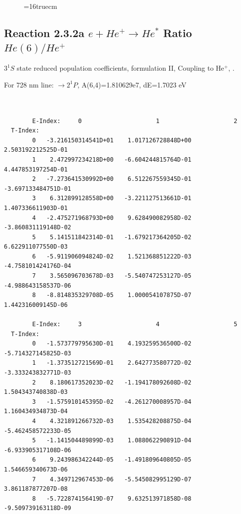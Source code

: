 \documentclass[12pt,dvipdfmx]{article}
\begin{document}
\begin{figure} \label{2.2e}
\epsfxsize=16truecm
\end{figure}
\newpage


\subsection{
  Reaction 2.3.2a $e + He^+ \rightarrow He^*  $ Ratio $He(6)/He^+$
}

  $3^1S$ state
  reduced population coefficients, formulation II,
  Coupling to He$^+$, \cite{kn:Fujimoto}.

  For 728 nm line:  $\rightarrow 2^1P$, A(6,4)=1.810629e7, dE=1.7023 eV

\begin{small}\begin{verbatim}


        E-Index:     0                     1                     2
  T-Index:
        0   -3.216150314541D+01    1.017126728848D+00    2.503192212525D-01
        1    2.472997234218D+00   -6.604244815764D-01    4.447853197254D-01
        2   -7.273641530992D+00    6.512267559345D-01   -3.697133484751D-01
        3    6.312899128558D+00   -3.221127513661D-01    1.407336611903D-01
        4   -2.475271968793D+00    9.628490082958D-02   -3.860831119148D-02
        5    5.141511842314D-01   -1.679217364205D-02    6.622911077550D-03
        6   -5.911906094824D-02    1.521368851222D-03   -4.758101424176D-04
        7    3.565096703678D-03   -5.540747253127D-05   -4.988643158537D-06
        8   -8.814835329708D-05    1.000054107875D-07    1.442316009145D-06

        E-Index:     3                     4                     5
  T-Index:
        0   -1.573779795630D-01    4.193259536500D-02   -5.714327145825D-03
        1   -1.373512721569D-01    2.642773580772D-02   -3.333243832771D-03
        2    8.180617352023D-02   -1.194178092608D-02    1.504343740838D-03
        3   -1.575910145395D-02   -4.261270008957D-04    1.160434934873D-04
        4    4.321891266732D-03    1.535428208875D-04   -5.462458572233D-05
        5   -1.141504489899D-03    1.088062290891D-04   -6.933905317108D-06
        6    9.243986342244D-05   -1.491809640805D-05    1.546659340673D-06
        7    4.349712967453D-06   -5.545082995129D-07    3.861187877207D-08
        8   -5.722874156419D-07    9.632513971858D-08   -9.509739163118D-09


\end{verbatim}
\end{small}
\end{document}
